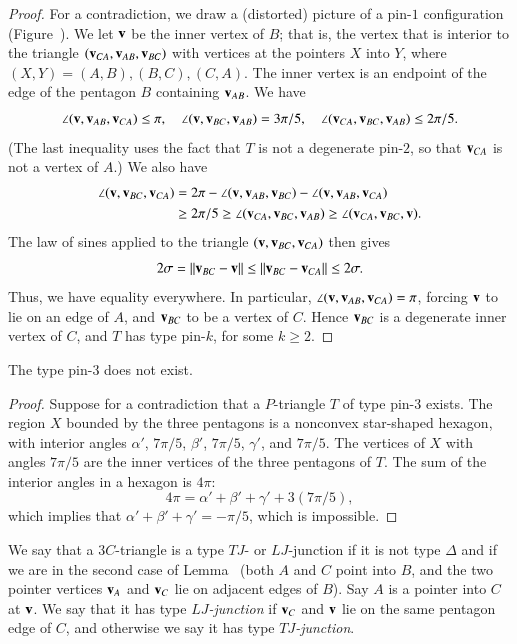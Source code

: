 \begin{proof} 
  For a contradiction, we draw a (distorted) picture of a pin-$1$
  configuration (Figure~).  We let ${\mathbf v}$ be the inner
  vertex of $B$; that is, the vertex that is interior to the triangle
  $({\mathbf v}_{CA},{\mathbf v}_{AB},{\mathbf v}_{BC})$ with vertices at the pointers $X$ into
  $Y$, where $(X,Y)=(A,B),(B,C),(C,A)$.  The inner vertex is an endpoint of the edge of the pentagon $B$ containing
  ${\mathbf v}_{AB}$.  We have
\[
\angle ({\mathbf v},{\mathbf v}_{AB},{\mathbf v}_{CA}) \le \pi,\quad 
\angle({\mathbf v},{\mathbf v}_{BC},{\mathbf v}_{AB}) = 3\pi/5,\quad
\angle({\mathbf v}_{CA},{\mathbf v}_{BC},{\mathbf v}_{AB})\le 2\pi/5.
\]
(The last inequality uses the fact that $T$ is not a degenerate
pin-$2$, so that ${\mathbf v}_{CA}$ is not a vertex of $A$.)  We also have
\begin{align*}
  \angle({\mathbf v},{\mathbf v}_{BC},{\mathbf v}_{CA}) &= 2\pi - \angle({\mathbf v},{\mathbf v}_{AB},{\mathbf v}_{BC}) - \angle({\mathbf v},{\mathbf v}_{AB},{\mathbf v}_{CA})\\
  &\ge 2\pi /5 
\ge \angle({\mathbf v}_{CA},{\mathbf v}_{BC},{\mathbf v}_{AB}) \ge \angle({\mathbf v}_{CA},{\mathbf v}_{BC},{\mathbf v}).
\end{align*}
The law of sines applied to the triangle $({\mathbf v},{\mathbf v}_{BC},{\mathbf v}_{CA})$ then
gives
\[
2\sigma =\norm{\v_{BC}}{\v}\le\norm{\v_{BC}}{\v_{CA}}\le 2\sigma.
\]
Thus, we have equality everywhere.  In particular,
$\angle({\mathbf v},{\mathbf v}_{AB},{\mathbf v}_{CA})=\pi$, forcing ${\mathbf v}$ to lie on an edge of $A$,
and ${\mathbf v}_{BC}$ to be a vertex of $C$.
Hence ${\mathbf v}_{BC}$ is a degenerate inner vertex of $C$, and $T$ has type
pin-$k$, for some $k\ge 2$.
\end{proof}

\begin{lemma}  The type pin-$3$ does not exist.  
\end{lemma}

\begin{proof} 
  Suppose for a contradiction that a $P$-triangle $T$ of type pin-$3$
  exists.  The region $X$ bounded by the three pentagons is a
  nonconvex star-shaped hexagon, with interior angles $\alpha'$,
  $7\pi/5$, $\beta'$, $7\pi/5$, $\gamma'$, and $7\pi/5$.  The vertices
  of $X$ with angles $7\pi/5$ are the inner vertices of the three
  pentagons of $T$.  The sum of the interior angles in a hexagon is
  $4\pi$:
\[
4\pi = \alpha'+\beta'+\gamma' + 3 (7\pi/5),
\]
which implies that $\alpha'+\beta'+\gamma' = -\pi/5$, which is
impossible.
\end{proof}

\begin{definition}
  We say that a $3C$-triangle is a type $TJ$- or $LJ$-junction if it
  is not type $\Delta$ and if we are in the second case of
  Lemma~ (both $A$ and $C$ point into $B$, and the two
  pointer vertices ${\mathbf v}_A$ and ${\mathbf v}_C$ lie on adjacent edges of $B$).
  Say $A$ is a pointer into $C$ at ${\mathbf v}$.  We say that it has type {\it
    $LJ$-junction} if ${\mathbf v}_C$ and ${\mathbf v}$ lie on the same pentagon edge of
  $C$, and otherwise we say it has type {\it $TJ$-junction}.
\end{definition}

